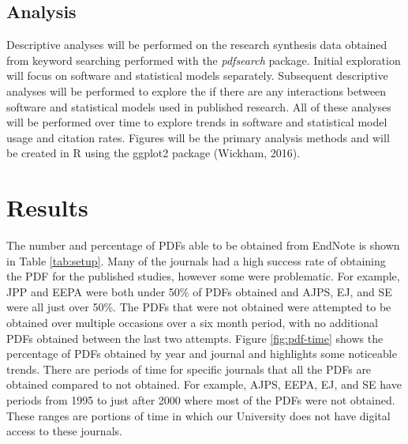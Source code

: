 \documentclass[english,,man]{apa6}
\begin{document}
\hypertarget{analysis}{%
\subsection{Analysis}\label{analysis}}

Descriptive analyses will be performed on the research synthesis data obtained from keyword searching performed with the \emph{pdfsearch} package. Initial exploration will focus on software and statistical models separately. Subsequent descriptive analyses will be performed to explore the if there are any interactions between software and statistical models used in published research. All of these analyses will be performed over time to explore trends in software and statistical model usage and citation rates. Figures will be the primary analysis methods and will be created in R using the ggplot2 package (Wickham, 2016).

\hypertarget{results}{%
\section{Results}\label{results}}

The number and percentage of PDFs able to be obtained from EndNote is shown in Table \ref{tab:setup}. Many of the journals had a high success rate of obtaining the PDF for the published studies, however some were problematic. For example, JPP and EEPA were both under 50\% of PDFs obtained and AJPS, EJ, and SE were all just over 50\%. The PDFs that were not obtained were attempted to be obtained over multiple occasions over a six month period, with no additional PDFs obtained between the last two attempts. Figure \ref{fig:pdf-time} shows the percentage of PDFs obtained by year and journal and highlights some noticeable trends. There are periods of time for specific journals that all the PDFs are obtained compared to not obtained. For example, AJPS, EEPA, EJ, and SE have periods from 1995 to just after 2000 where most of the PDFs were not obtained. These ranges are portions of time in which our University does not have digital access to these journals.
\end{document}
